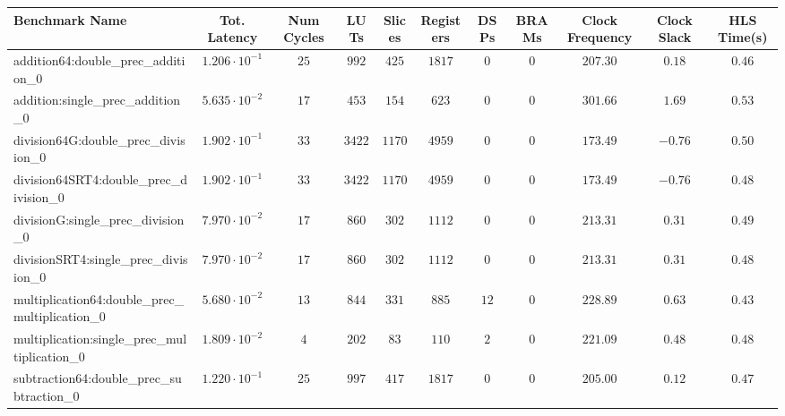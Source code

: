 \begin{tabular}{|l|c|c|c|c|c|c|c|c|c|c|}
\hline
Benchmark Name                                   & Tot. Latency            & Num Cycles & LUTs      & Slices   & Registers & DSPs   & BRAMs & Clock Frequency & Clock Slack & HLS Time(s) \\
\hline
addition64:double\_prec\_addition\_0             & $ 1.206 \cdot 10^{-1} $ & $ 25     $ & $ 992   $ & $ 425  $ & $ 1817  $ & $ 0  $ & $ 0 $ & $ 207.30      $ & $ 0.18    $ & $ 0.46    $ \\
addition:single\_prec\_addition\_0               & $ 5.635 \cdot 10^{-2} $ & $ 17     $ & $ 453   $ & $ 154  $ & $ 623   $ & $ 0  $ & $ 0 $ & $ 301.66      $ & $ 1.69    $ & $ 0.53    $ \\
division64G:double\_prec\_division\_0            & $ 1.902 \cdot 10^{-1} $ & $ 33     $ & $ 3422  $ & $ 1170 $ & $ 4959  $ & $ 0  $ & $ 0 $ & $ 173.49      $ & $ -0.76   $ & $ 0.50    $ \\
division64SRT4:double\_prec\_division\_0         & $ 1.902 \cdot 10^{-1} $ & $ 33     $ & $ 3422  $ & $ 1170 $ & $ 4959  $ & $ 0  $ & $ 0 $ & $ 173.49      $ & $ -0.76   $ & $ 0.48    $ \\
divisionG:single\_prec\_division\_0              & $ 7.970 \cdot 10^{-2} $ & $ 17     $ & $ 860   $ & $ 302  $ & $ 1112  $ & $ 0  $ & $ 0 $ & $ 213.31      $ & $ 0.31    $ & $ 0.49    $ \\
divisionSRT4:single\_prec\_division\_0           & $ 7.970 \cdot 10^{-2} $ & $ 17     $ & $ 860   $ & $ 302  $ & $ 1112  $ & $ 0  $ & $ 0 $ & $ 213.31      $ & $ 0.31    $ & $ 0.48    $ \\
multiplication64:double\_prec\_multiplication\_0 & $ 5.680 \cdot 10^{-2} $ & $ 13     $ & $ 844   $ & $ 331  $ & $ 885   $ & $ 12 $ & $ 0 $ & $ 228.89      $ & $ 0.63    $ & $ 0.43    $ \\
multiplication:single\_prec\_multiplication\_0   & $ 1.809 \cdot 10^{-2} $ & $ 4      $ & $ 202   $ & $ 83   $ & $ 110   $ & $ 2  $ & $ 0 $ & $ 221.09      $ & $ 0.48    $ & $ 0.48    $ \\
subtraction64:double\_prec\_subtraction\_0       & $ 1.220 \cdot 10^{-1} $ & $ 25     $ & $ 997   $ & $ 417  $ & $ 1817  $ & $ 0  $ & $ 0 $ & $ 205.00      $ & $ 0.12    $ & $ 0.47    $ \\

\end{tabular}
